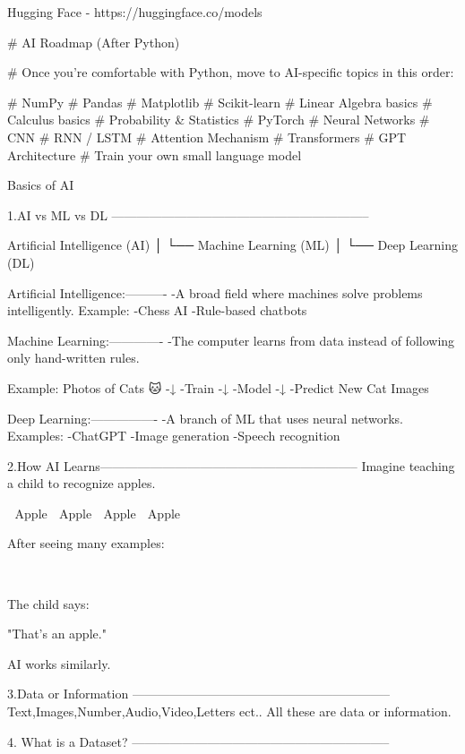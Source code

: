 Hugging Face - https://huggingface.co/models


# AI Roadmap (After Python)

# Once you're comfortable with Python, move to AI-specific topics in this order:

# NumPy
# Pandas
# Matplotlib
# Scikit-learn
# Linear Algebra basics
# Calculus basics
# Probability & Statistics
# PyTorch
# Neural Networks
# CNN
# RNN / LSTM
# Attention Mechanism
# Transformers
# GPT Architecture
# Train your own small language model



Basics of AI

1.AI vs ML vs DL --------------------------------------------------------------

Artificial Intelligence (AI)
        │
        └── Machine Learning (ML)
                 │
                 └── Deep Learning (DL)

Artificial Intelligence:----------
   -A broad field where machines solve problems intelligently.           
Example:         
   -Chess AI
   -Rule-based chatbots

Machine Learning:-------------
   -The computer learns from data instead of following only hand-written rules.
                 
Example:     
Photos of Cats 🐱
    -↓
    -Train
    -↓
    -Model
    -↓
    -Predict New Cat Images

Deep Learning:----------------
   -A branch of ML that uses neural networks.
Examples:
   -ChatGPT
   -Image generation
   -Speech recognition





2.How AI Learns--------------------------------------------------------------
Imagine teaching a child to recognize apples.

🍎 Apple
🍎 Apple
🍎 Apple
🍎 Apple

After seeing many examples:

🍎

The child says:

"That's an apple."

AI works similarly.


3.Data or Information --------------------------------------------------------------
Text,Images,Number,Audio,Video,Letters ect.. All these are data or information.



4. What is a Dataset?
--------------------------------------------------------------


